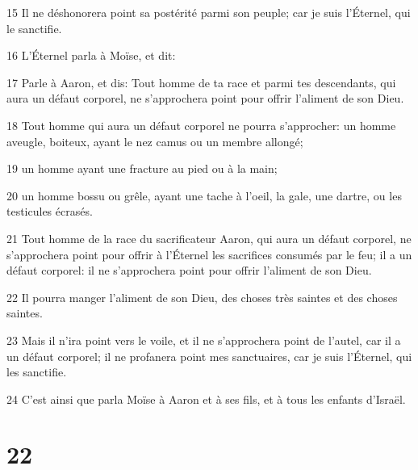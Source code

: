 \par 15 Il ne déshonorera point sa postérité parmi son peuple; car je suis l'Éternel, qui le sanctifie.
\par 16 L'Éternel parla à Moïse, et dit:
\par 17 Parle à Aaron, et dis: Tout homme de ta race et parmi tes descendants, qui aura un défaut corporel, ne s'approchera point pour offrir l'aliment de son Dieu.
\par 18 Tout homme qui aura un défaut corporel ne pourra s'approcher: un homme aveugle, boiteux, ayant le nez camus ou un membre allongé;
\par 19 un homme ayant une fracture au pied ou à la main;
\par 20 un homme bossu ou grêle, ayant une tache à l'oeil, la gale, une dartre, ou les testicules écrasés.
\par 21 Tout homme de la race du sacrificateur Aaron, qui aura un défaut corporel, ne s'approchera point pour offrir à l'Éternel les sacrifices consumés par le feu; il a un défaut corporel: il ne s'approchera point pour offrir l'aliment de son Dieu.
\par 22 Il pourra manger l'aliment de son Dieu, des choses très saintes et des choses saintes.
\par 23 Mais il n'ira point vers le voile, et il ne s'approchera point de l'autel, car il a un défaut corporel; il ne profanera point mes sanctuaires, car je suis l'Éternel, qui les sanctifie.
\par 24 C'est ainsi que parla Moïse à Aaron et à ses fils, et à tous les enfants d'Israël.

\chapter{22}

